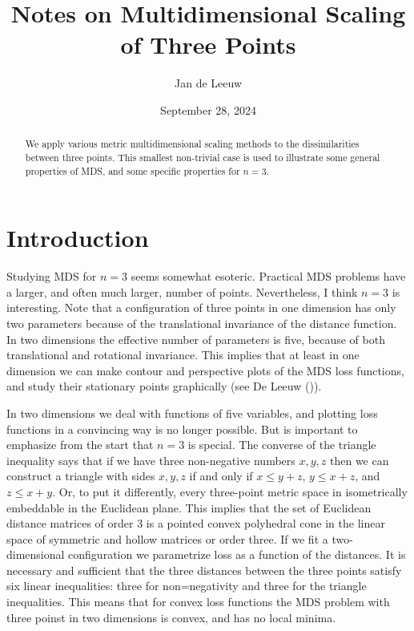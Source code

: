 \documentclass[
  12pt,
  letterpaper,
  DIV=11,
  numbers=noendperiod]{scrartcl}
\title{Notes on Multidimensional Scaling of Three Points}
\author{Jan de Leeuw}
\date{September 28, 2024}
\begin{document}
\maketitle
\begin{abstract}
We apply various metric multidimensional scaling methods to the
dissimilarities between three points. This smallest non-trivial case is
used to illustrate some general properties of MDS, and some specific
properties for \(n=3\).
\end{abstract}


\section{Introduction}\label{introduction}

Studying MDS for \(n=3\) seems somewhat esoteric. Practical MDS problems
have a larger, and often much larger, number of points. Nevertheless, I
think \(n=3\) is interesting. Note that a configuration of three points
in one dimension has only two parameters because of the translational
invariance of the distance function. In two dimensions the effective
number of parameters is five, because of both translational and
rotational invariance. This implies that at least in one dimension we
can make contour and perspective plots of the MDS loss functions, and
study their stationary points graphically (see De Leeuw
()).

In two dimensions we deal with functions of five variables, and plotting
loss functions in a convincing way is no longer possible. But is
important to emphasize from the start that \(n=3\) is special. The
converse of the triangle inequality says that if we have three
non-negative numbers \(x,y,z\) then we can construct a triangle with
sides \(x,y,z\) if and only if \(x\leq y+z\), \(y\leq x+z\), and
\(z\leq x+y\). Or, to put it differently, every three-point metric space
in isometrically embeddable in the Euclidean plane. This implies that
the set of Euclidean distance matrices of order \(3\) is a pointed
convex polyhedral cone in the linear space of symmetric and hollow
matrices or order three. If we fit a two-dimensional configuration we
parametrize loss as a function of the distances. It is necessary and
sufficient that the three distances between the three points satisfy six
linear inequalities: three for non=negativity and three for the triangle
inequalities. This means that for convex loss functions the MDS problem
with three poinst in two dimensions is convex, and has no local minima.
\end{document}
